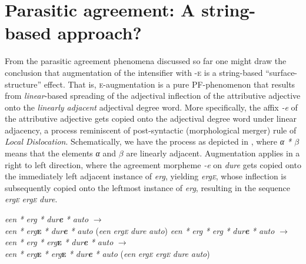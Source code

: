 \documentclass[output=paper]{langsci/langscibook}
\begin{document}
\section{Parasitic agreement: A string-based approach?}\label{sec:key:18.5}

From the parasitic agreement phenomena discussed so far one might draw the
conclusion that augmentation of the intensifier with \textsc{-e} is a
string-based “surface-structure” effect. That is, \textsc{e}-augmentation is a
pure \gls{PF}-phenomenon that results from \emph{linear}-based spreading of the
adjectival inflection of the attributive adjective onto the \emph{linearly
adjacent} adjectival degree word. More specifically, the affix \emph{-e} of the
attributive adjective gets copied onto the adjectival degree word under linear
adjacency, a process reminiscent of 
post-syntactic (morphological merger) rule of \emph{Local Dislocation}.
Schematically, we have the process as depicted in , where
\emph{α * ${\beta}$} means that the elements \emph{α} and \emph{${\beta}$} are
linearly adjacent. Augmentation applies in a right to left direction, where the
agreement morpheme \emph{-e} on \emph{dure} gets copied onto the immediately
left adjacent instance of \emph{erg}, yielding \emph{erg\textsc{e}}, whose
inflection is subsequently copied onto the leftmost instance of \emph{erg},
resulting in the sequence \emph{erg\textsc{e}} \emph{erg\textsc{e}}
\emph{dure}.

\ea%
    \label{ex:key:18.20}
	\ea \emph{een}   \emph{*} \emph{erg}   \emph{*} \emph{dur}\textbf{\emph{e}} \emph{*} \emph{auto}                ${\rightarrow}$ \\
              \emph{een} \emph{*} \emph{erg}\textbf{\textsc{e}} \emph{*}
              \emph{dur}\textbf{\emph{e}} \emph{*} \emph{auto}
              (\emph{een} \emph{erg\textsc{e}} \emph{dure} \emph{auto})
	\ex \emph{een} \emph{*} \emph{erg} \emph{*} \emph{erg} \emph{*} \emph{dur}\textbf{\emph{e}} \emph{*} \emph{auto}      ${\rightarrow}$ \\
              \emph{een} \emph{*} \emph{erg} \emph{*} \emph{erg}\textbf{\textsc{e}} \emph{*} \emph{dur}\textbf{\emph{e}} \emph{*} \emph{auto}    ${\rightarrow}$ \\
              \emph{een} \emph{*} \emph{erg}\textbf{\textsc{e}} \emph{*}
              \emph{erg}\textbf{\textsc{e}} \emph{*}
              \emph{dur}\textbf{\emph{e}} \emph{*} \emph{auto}
              (\emph{een} \emph{erg\textsc{e}} \emph{erg\textsc{e}} \emph{dure}
              \emph{auto})
	\z
\z
\end{document}
